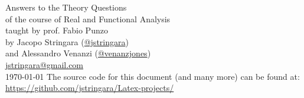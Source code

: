 \begin{titlepage}
    \begin{center}
        \vspace*{\fill}
        \Huge
        Answers to the Theory Questions\\
        \vspace{0.5em}
        \Large
        of the course of Real and Functional Analysis\\
        taught by prof. Fabio Punzo \\
        \vspace{0.5em}
        by Jacopo Stringara (\href{https://github.com/jstringara}{@jstringara})\\
        and Alessandro Venanzi (\href{https://github.com/venanzjones}{@venanzjones})\\
        \vspace{0.5em}
        \href{mailto:jstringara@gmail.com}{jstringara@gmail.com} \\
        \vspace{0.5em}
        \today
        \vfill
        The source code for this document (and many more) can be found at:\\
        \href{https://github.com/jstringara/Latex-projects/}{https://github.com/jstringara/Latex-projects/}
    \end{center}
\end{titlepage}
